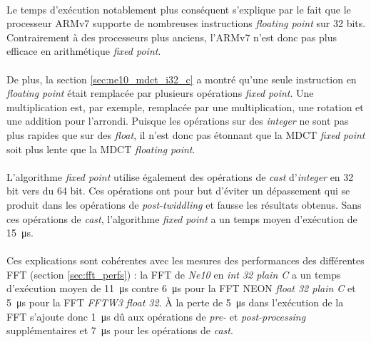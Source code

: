 \documentclass{article}
\begin{document}
    \paragraph{}
    Le temps d'exécution notablement plus conséquent s'explique par le fait que le processeur ARMv7 supporte de nombreuses instructions \emph{floating point} sur 32 bits. Contrairement à des processeurs plus anciens, l'ARMv7 n'est donc pas plus efficace en arithmétique \emph{fixed point}.

    \paragraph{}
    De plus, la section \ref{sec:ne10_mdct_i32_c} a montré qu'une seule instruction en \emph{floating point} était remplacée par plusieurs opérations \emph{fixed point}. Une multiplication est, par exemple, remplacée par une multiplication, une rotation et une addition pour l'arrondi. Puisque les opérations sur des \emph{integer} ne sont pas plus rapides que sur des \emph{float}, il n'est donc pas étonnant que la MDCT \emph{fixed point} soit plus lente que la MDCT \emph{floating point}.

    \paragraph{}
    L'algorithme \emph{fixed point} utilise également des opérations de \emph{cast} d'\emph{integer} en 32 bit vers du 64 bit. Ces opérations ont pour but d'éviter un dépassement qui se produit dans les opérations de \emph{post-twiddling} et fausse les résultats obtenus. Sans ces opérations de \emph{cast}, l'algorithme \emph{fixed point} a un temps moyen d'exécution de \SI{15}{\micro\second}.

    \paragraph{}
    Ces explications sont cohérentes avec les mesures des performances des différentes FFT (section \ref{sec:fft_perfs}) : la FFT de \emph{Ne10} en \emph{int 32 plain C} a un temps d'exécution moyen de \SI{11}{\micro\second} contre \SI{6}{\micro\second} pour la FFT NEON \emph{float 32 plain C} et \SI{5}{\micro\second} pour la FFT \emph{FFTW3 float 32}. À la perte de \SI{5}{\micro\second} dans l'exécution de la FFT s'ajoute donc \SI{1}{\micro\second} dû aux opérations de \emph{pre-} et \emph{post-processing} supplémentaires et \SI{7}{\micro\second} pour les opérations de \emph{cast}.
\end{document}

